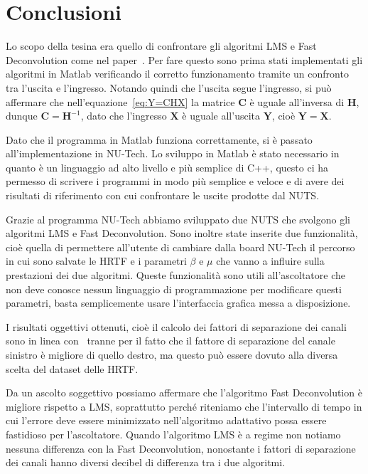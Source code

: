 \documentclass[12pt,a4paper,titlepage]{article}
\begin{document}
\clearpage

\section{Conclusioni}
\label{sec:conclusioni}
Lo scopo della tesina era quello di confrontare gli algoritmi LMS e Fast Deconvolution come nel paper~\cite{Li:comprehensive_comparison}. Per fare questo sono prima stati implementati gli algoritmi in Matlab verificando il corretto funzionamento tramite un confronto tra l'uscita e l'ingresso. Notando quindi che l'uscita segue l'ingresso, si può affermare che nell'equazione~\eqref{eq:Y=CHX} la matrice $\mathbf{C}$ è uguale all'inversa di $\mathbf{H}$, dunque $\mathbf{C} = \mathbf{H}^{-1}$, dato che l'ingresso $\mathbf{X}$ è uguale all'uscita $\mathbf{Y}$, cioè $\mathbf{Y} = \mathbf{X}$.

Dato che il programma in Matlab funziona correttamente, si è passato all'implementazione in NU-Tech. Lo sviluppo in Matlab è stato necessario in quanto è un linguaggio ad alto livello e più semplice di C++, questo ci ha permesso di scrivere i programmi in modo più semplice e veloce e di avere dei risultati di riferimento con cui confrontare le uscite prodotte dal NUTS.

Grazie al programma NU-Tech abbiamo sviluppato due NUTS che svolgono gli algoritmi LMS e Fast Deconvolution. Sono inoltre state inserite due funzionalità, cioè quella di permettere all'utente di cambiare dalla board NU-Tech il percorso in cui sono salvate le HRTF e i parametri $\beta$ e $\mu$ che vanno a influire sulla prestazioni dei due algoritmi. Queste funzionalità sono utili all'ascoltatore che non deve conosce nessun linguaggio di programmazione per modificare questi parametri, basta semplicemente usare l'interfaccia grafica messa a disposizione.

I risultati oggettivi ottenuti, cioè il calcolo dei fattori di separazione dei canali sono in linea con~\cite{Li:comprehensive_comparison} tranne per il fatto che il fattore di separazione del canale sinistro è migliore di quello destro, ma questo può essere dovuto alla diversa scelta del dataset delle HRTF.

Da un ascolto soggettivo possiamo affermare che l'algoritmo Fast Deconvolution è migliore rispetto a LMS, soprattutto perché riteniamo che l'intervallo di tempo in cui l'errore deve essere minimizzato nell'algoritmo adattativo possa essere fastidioso per l'ascoltatore. Quando l'algoritmo LMS è a regime non notiamo nessuna differenza con la Fast Deconvolution, nonostante i fattori di separazione dei canali hanno diversi decibel di differenza tra i due algoritmi.
\end{document}
